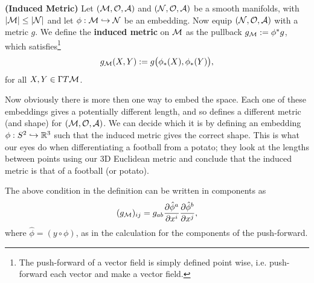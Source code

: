 \documentclass[12pt]{article} %
\newcommand{\bfs}[1]{\textbf{({#1}) }}
\begin{document}
\bd\bfs{Induced Metric}\label{def:dfafrerq}
    Let $(\mathcal{M},\mathcal{O},\mathcal{A})$ and $(\mathcal{N},\mathcal{O},\mathcal{A})$ be a smooth manifolds, with $|\mathcal{M}|\leq |\mathcal{N}|$ and let $\phi:\mathcal{M}\hookrightarrow\mathcal{N}$ be an embedding. Now equip $(\mathcal{N},\mathcal{O},\mathcal{A})$ with a metric $g$. We define the \textbf{induced metric} on $\mathcal{M}$ as the pullback $g_{\mathcal{M}} := \phi^* g$, which satisfies\footnote{The push-forward of a vector field is simply defined point wise, i.e. push-forward each vector and make a vector field.} 
    \begin{align*} 
        g_{\mathcal{M}}(X,Y) := g\big(\phi_*(X),\phi_*(Y)\big),
    \end{align*} 
    for all $X,Y\in \Gamma T\mathcal{M}$. 
\ed 
\begin{rema}
Now obviously there is more then one way to embed the space. Each one of these embeddings gives a potentially different length, and so defines a different metric (and shape) for $(\mathcal{M},\mathcal{O},\mathcal{A})$. We can decide which it is by defining an embedding $\phi:S^2\hookrightarrow\mathbb{R}^3$ such that the induced metric gives the correct shape. This is what our eyes do when differentiating a football from a potato; they look at the lengths between points using our 3D Euclidean metric and conclude that the induced metric is that of a football (or potato). 
\end{rema}

The above condition in the definition can be written in components as 
\begin{align*}
    (g_{\mathcal{M}})_{ij} = g_{ab} \frac{\partial \hat{\phi}^a}{\partial x^i}\frac{\partial \hat{\phi}^b}{\partial x^j},
\end{align*} 
where $\hat{\phi} = (y\circ \phi)$, as in the calculation for the components of the push-forward.
\end{document}
